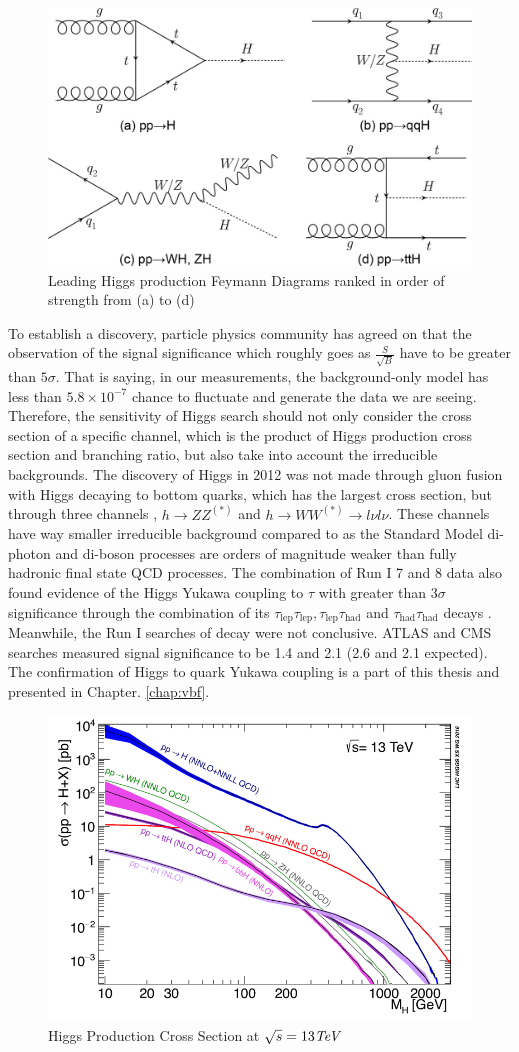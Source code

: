 \begin{figure}[htpb!]
\begin{center}
  \includegraphics[width=0.45\linewidth]{figures/theory/ProductionFeymann}
\caption{Leading Higgs production Feymann Diagrams ranked in order of strength from (a) to (d)}
\label{fig:theory-higgsfeymann}
\end{center}
\end{figure}


To establish a discovery, particle physics community has agreed on that the observation of the signal significance which roughly goes as $\frac{S}{\sqrt{B}}$ have to be greater than $5\sigma$. That is saying, in our measurements, the background-only model has less than $5.8\times 10^{-7}$ chance to fluctuate and generate the data we are seeing. Therefore, the sensitivity of Higgs search should not only consider the cross section of a specific channel, which is the product of Higgs production cross section and branching ratio, but also take into account the irreducible backgrounds. The discovery of Higgs in 2012 was not made through gluon fusion with Higgs decaying to bottom quarks, which has the largest cross section, but through three channels \Hgammagamma, $h\rightarrow ZZ^{(*)}$ and $h\rightarrow WW^{(*)}\rightarrow l\nu l\nu$\cite{HIGG-2012-27,CMS-HIG-12-028}. These channels have way smaller irreducible background compared to \Hbb as the Standard Model di-photon and di-boson processes are orders of magnitude weaker than fully hadronic final state QCD processes. The combination of Run I 7 and 8 \tev data also found evidence of the Higgs Yukawa coupling to $\tau$ with greater than $3\sigma$ significance through the combination of its $\tau_{\text{lep}}\tau_{\text{lep}},\tau_{\text{lep}}\tau_{\text{had}}$ and $\tau_{\text{had}}\tau_{\text{had}}$ decays \cite{HIGG-2013-32,CMS-HIG-13-004}. Meanwhile, the Run I searches of \Hbb decay were not conclusive. ATLAS and CMS searches measured signal significance to be 1.4 and 2.1 (2.6 and 2.1 expected)\cite{HIGG-2013-23,CMS-HIG-13-012}. The confirmation of Higgs to quark Yukawa coupling is a part of this thesis and presented in Chapter. \ref{chap:vbf}. 



\begin{figure}[htpb!]
\begin{center}
  \includegraphics[width=0.6\linewidth]{figures/theory/HiggsCrossSection.png}
\caption{Higgs Production Cross Section at $\sqrt{s}= 13\textit{TeV}$ \cite{CERN-YELLOW-BOOK}}
\label{fig:theory-higgsp}
\end{center}
\end{figure}

